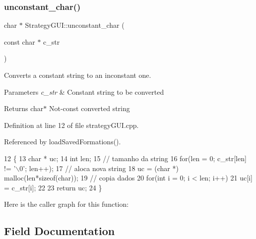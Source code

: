 \subsubsection{\texorpdfstring{unconstant\+\_\+char()}{unconstant\_char()}}
{\footnotesize\ttfamily char $\ast$ Strategy\+G\+U\+I\+::unconstant\+\_\+char (\begin{DoxyParamCaption}\item[{const char $\ast$}]{c\+\_\+str }\end{DoxyParamCaption})\hspace{0.3cm}{\ttfamily [private]}}



Converts a constant string to an inconstant one. 


\begin{DoxyParams}{Parameters}
{\em c\+\_\+str} & Constant string to be converted \\
\hline
\end{DoxyParams}
\begin{DoxyReturn}{Returns}
char$\ast$ Not-\/const converted string 
\end{DoxyReturn}


Definition at line 12 of file strategy\+G\+U\+I.\+cpp.



Referenced by load\+Saved\+Formations().


\begin{DoxyCode}
12                                                       \{
13     \textcolor{keywordtype}{char} * uc;
14     \textcolor{keywordtype}{int} len;
15     \textcolor{comment}{// tamanho da string}
16     \textcolor{keywordflow}{for}(len = 0; c\_str[len] != \textcolor{charliteral}{'\(\backslash\)0'}; len++);
17     \textcolor{comment}{// aloca nova string}
18     uc = (\textcolor{keywordtype}{char} *) malloc(len*\textcolor{keyword}{sizeof}(\textcolor{keywordtype}{char}));
19     \textcolor{comment}{// copia dados}
20     \textcolor{keywordflow}{for}(\textcolor{keywordtype}{int} i = 0; i < len; i++)
21         uc[i] = c\_str[i];
22 
23     \textcolor{keywordflow}{return} uc;
24 \}
\end{DoxyCode}
Here is the caller graph for this function\+:


\subsection{Field Documentation}
\mbox{\label{class_strategy_g_u_i_a0c1c6c29081524b2f721722867bc0c14}} 
